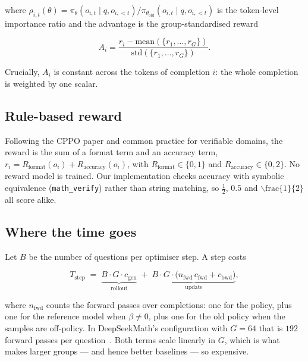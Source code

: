 \documentclass[11pt,a4paper]{article}
\newcommand{\Adv}{A}
\newcommand{\polold}{\pi_{\theta_{\mathrm{old}}}}
\newcommand{\pol}{\pi_{\theta}}
\begin{document}
where $\rho_{i,t}(\theta) = \pol(o_{i,t} \mid q, o_{i,<t}) / \polold(o_{i,t}
\mid q, o_{i,<t})$ is the token-level importance ratio and the advantage is
the group-standardised reward

\begin{equation}
\label{eq:advantage}
\Adv_i = \frac{r_i - \mathrm{mean}(\{r_1,\dots,r_G\})}
              {\mathrm{std}(\{r_1,\dots,r_G\})}.
\end{equation}

Crucially, $\Adv_i$ is constant across the tokens of completion $i$: the whole
completion is weighted by one scalar.

\subsection{Rule-based reward}

Following the CPPO paper and common practice for verifiable domains, the
reward is the sum of a format term and an accuracy term,
$r_i = R_{\mathrm{format}}(o_i) + R_{\mathrm{accuracy}}(o_i)$, with
$R_{\mathrm{format}} \in \{0,1\}$ and $R_{\mathrm{accuracy}} \in \{0,2\}$. No
reward model is trained. Our implementation checks accuracy with
symbolic equivalence (\texttt{math\_verify}) rather than string matching, so
$\tfrac{1}{2}$, $0.5$ and $\backslash\mathrm{frac}\{1\}\{2\}$ all score alike.

\subsection{Where the time goes}

Let $B$ be the number of questions per optimiser step. A step costs

\begin{equation}
\label{eq:grpo-cost}
T_{\mathrm{step}} \;=\; \underbrace{B \cdot G \cdot c_{\mathrm{gen}}}_{\text{rollout}}
\;+\; \underbrace{B \cdot G \cdot \big(n_{\mathrm{fwd}}\, c_{\mathrm{fwd}} + c_{\mathrm{bwd}}\big)}_{\text{update}},
\end{equation}

where $n_{\mathrm{fwd}}$ counts the forward passes over completions: one for
the policy, plus one for the reference model when $\beta \neq 0$, plus one for
the old policy when the samples are off-policy. In DeepSeekMath's
configuration with $G=64$ that is $192$ forward passes per
question~\cite{lin2025cppo}. Both terms scale linearly in $G$, which is what
makes larger groups --- and hence better baselines --- so expensive.
\end{document}
